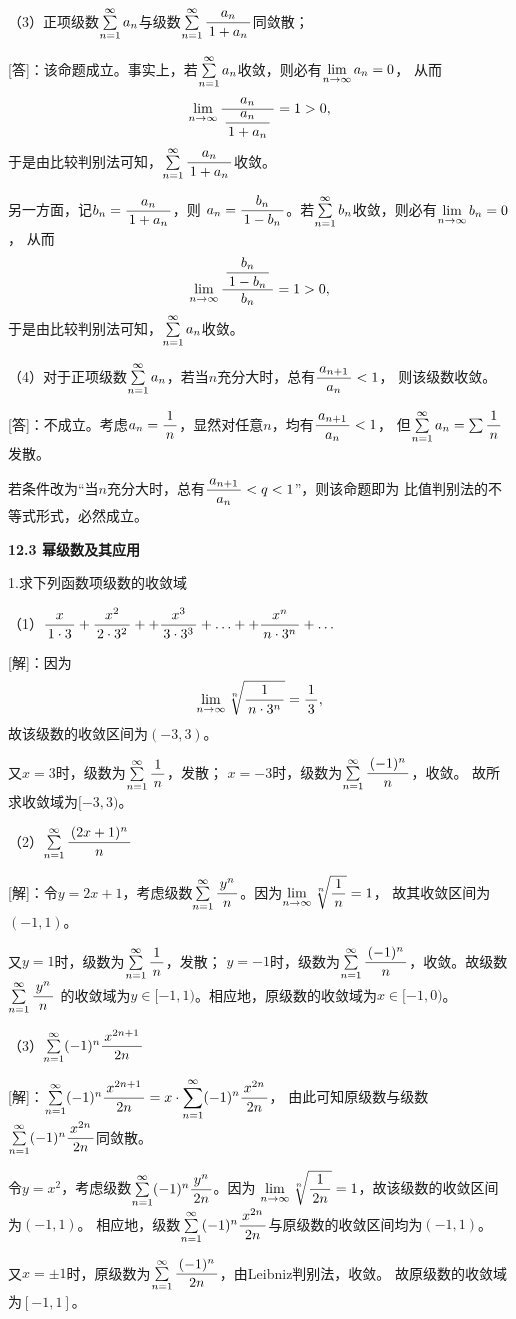 （3）正项级数$\sumn a_n$与级数$\sumn\df{a_n}{1+a_n}$同敛散；

[答]：该命题成立。事实上，若$\sumn a_n$收敛，则必有$\limn a_n=0$，
从而
$$\limn\df{a_n}{\df{a_n}{1+a_n}}=1>0,$$
于是由比较判别法可知，$\sumn\df{a_n}{1+a_n}$收敛。

另一方面，记$b_n=\df{a_n}{1+a_n}$，则
$a_n=\df{b_n}{1-b_n}$。若$\sumn b_n$收敛，则必有$\limn b_n=0$，
从而
$$\limn\df{\df{b_n}{1-b_n}}{b_n}=1>0,$$
于是由比较判别法可知，$\sumn a_n$收敛。

（4）对于正项级数$\sumn a_n$，若当$n$充分大时，总有$\df{a_{n+1}}{a_n}<1$，
则该级数收敛。

[答]：不成立。考虑$a_n=\df1n$，显然对任意$n$，均有$\df{a_{n+1}}{a_n}<1$，
但$\sumn a_n=\sum\df1n$发散。

若条件改为“当$n$充分大时，总有$\df{a_{n+1}}{a_n}<q<1$”，则该命题即为
比值判别法的不等式形式，必然成立。
\fin

\begin{center}
	\bf 12.3 幂级数及其应用
\end{center}

1.求下列函数项级数的收敛域

（1）$\df x{1\cdot 3}+\df{x^2}{2\cdot3^2}++\df{x^3}{3\cdot3^3}
+\ldots++\df{x^n}{n\cdot3^n}+\ldots$

[解]：因为
$$\limn\sqrt[n]{\df1{n\cdot 3^n}}=\df13,$$
故该级数的收敛区间为$(-3,3)$。

又$x=3$时，级数为$\sumn\df1n$，发散；
$x=-3$时，级数为$\sumn\df{(-1)^n}n$，收敛。
故所求收敛域为$[-3,3)$。

（2）$\sumn\df{(2x+1)^n}n$

[解]：令$y=2x+1$，考虑级数$\sumn\df{y^n}n$。因为$\limn\sqrt[n]{\df1n}=1$，
故其收敛区间为$(-1,1)$。

又$y=1$时，级数为$\sumn\df1n$，发散；
$y=-1$时，级数为$\sumn\df{(-1)^n}n$，收敛。故级数$\sumn\df{y^n}n$
的收敛域为$y\in[-1,1)$。相应地，原级数的收敛域为$x\in[-1,0)$。

（3）$\sumn(-1)^n\df{x^{2n+1}}{2n}$

[解]：$\sumn(-1)^n\df{x^{2n+1}}{2n}=x\cdot\sumn(-1)^n\df{x^{2n}}{2n}$，
由此可知原级数与级数$\sumn(-1)^n\df{x^{2n}}{2n}$同敛散。

令$y=x^2$，考虑级数$\sumn(-1)^n\df{y^{n}}{2n}$。因为
$\limn\sqrt[n]{\df1{2n}}=1$，故该级数的收敛区间为$(-1,1)$。
相应地，级数$\sumn(-1)^n\df{x^{2n}}{2n}$与原级数的收敛区间均为$(-1,1)$。

又$x=\pm1$时，原级数为$\sumn\df{(-1)^n}{2n}$，由Leibniz判别法，收敛。
故原级数的收敛域为$[-1,1]$。

